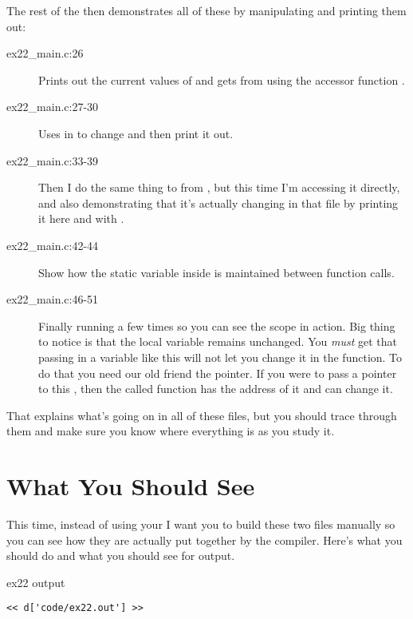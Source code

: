 The rest of the  then demonstrates all of these by
manipulating and printing them out:

\begin{description}
\item[ex22\_main.c:26] Prints out the current values of  and gets
     from  using the accessor function
    .
\item[ex22\_main.c:27-30] Uses  in  to change 
    and then print it out.
\item[ex22\_main.c:33-39] Then I do the same thing to  from ,
    but this time I'm accessing it directly, and also demonstrating that it's
    actually changing in that file by printing it here and with .
\item[ex22\_main.c:42-44] Show how the static variable  inside 
    is maintained between function calls.
\item[ex22\_main.c:46-51] Finally running  a few times so you can see
    the scope in action.  Big thing to notice is that the local 
    variable remains unchanged.  You \emph{must} get that passing in a variable
    like this will not let you change it in the function.  To do that you need
    our old friend the pointer.  If you were to pass a pointer to this ,
    then the called function has the address of it and can change it.
\end{description}

That explains what's going on in all of these files, but you should trace
through them and make sure you know where everything is as you study it.

\section{What You Should See}

This time, instead of using your  I want you to build these
two files manually so you can see how they are actually put together by
the compiler.  Here's what you should do and what you should see for output.

\begin{code}{ex22 output}
\begin{lstlisting}
<< d['code/ex22.out'] >>
\end{lstlisting}
\end{code}

